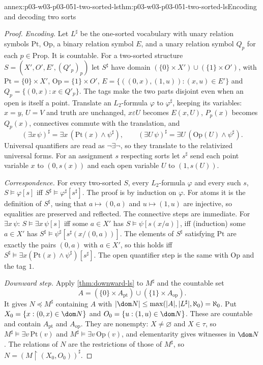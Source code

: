 \begin{annexitem}{annex:p03-w03-p03-051-two-sorted-ls}{thm:p03-w03-p03-051-two-sorted-ls}{Encoding and decoding two sorts}
\begin{proof}
\emph{Encoding.} Let \(L^\sharp\) be the one-sorted vocabulary with unary
relation symbols \(\mathrm{Pt}\), \(\mathrm{Op}\), a binary relation symbol
\(E\), and a unary relation symbol \(Q_p\) for each \(p\in\mathrm{Prop}\).
It is countable. For a two-sorted structure \(S=(X',O',E',(Q'_p)_p)\) let
\(S^\sharp\) have domain \((\{0\}\times X')\cup(\{1\}\times O')\), with
\(\mathrm{Pt}=\{0\}\times X'\), \(\mathrm{Op}=\{1\}\times O'\),
\(E=\{((0,x),(1,u)):(x,u)\in E'\}\) and
\(Q_p=\{(0,x):x\in Q'_p\}\). The tags make the two parts disjoint even when
an open is itself a point. Translate an \(L_2\)-formula \(\varphi\) to
\(\varphi^\sharp\), keeping its variables: \(x=y\), \(U=V\) and truth are
unchanged, \(x\varepsilon U\) becomes \(E(x,U)\), \(P_p(x)\) becomes
\(Q_p(x)\), connectives commute with the translation, and
\[
 (\exists x\,\psi)^\sharp=\exists x\,(\mathrm{Pt}(x)\land\psi^\sharp),\qquad
 (\exists U\,\psi)^\sharp=\exists U\,(\mathrm{Op}(U)\land\psi^\sharp).
\]
Universal quantifiers are read as \(\neg\exists\neg\), so they translate
to the relativized universal forms. For an assignment \(s\) respecting
sorts let \(s^\sharp\) send each point variable \(x\) to \((0,s(x))\) and
each open variable \(U\) to \((1,s(U))\).

\emph{Correspondence.} For every two-sorted \(S\), every \(L_2\)-formula
\(\varphi\) and every such \(s\),
\(S\models\varphi[s]\) iff \(S^\sharp\models\varphi^\sharp[s^\sharp]\).
The proof is by induction on \(\varphi\). For atoms it is the definition
of \(S^\sharp\), using that \(a\mapsto(0,a)\) and \(u\mapsto(1,u)\) are
injective, so equalities are preserved and reflected. The connective steps
are immediate. For \(\exists x\,\psi\): \(S\models\exists x\,\psi[s]\) iff
some \(a\in X'\) has \(S\models\psi[s(x/a)]\), iff (induction) some
\(a\in X'\) has \(S^\sharp\models\psi^\sharp[s^\sharp(x/(0,a))]\). The
elements of \(S^\sharp\) satisfying \(\mathrm{Pt}\) are exactly the pairs
\((0,a)\) with \(a\in X'\), so this holds iff
\(S^\sharp\models\exists x(\mathrm{Pt}(x)\land\psi^\sharp)[s^\sharp]\).
The open quantifier step is the same with \(\mathrm{Op}\) and the tag
\(1\).

\emph{Downward step.} Apply \cref{thm:downward-ls} to \(M^\sharp\) and
the countable set
\[
 A=(\{0\}\times A_{\mathrm{pt}})\cup(\{1\}\times A_{\mathrm{op}}).
\]
It gives \(N\preccurlyeq M^\sharp\) containing \(A\) with
\(\lvert\dom N\rvert\le\max(\lvert A\rvert,\lvert L^\sharp\rvert,\aleph_0)
=\aleph_0\). Put \(X_0=\{x:(0,x)\in\dom N\}\) and
\(O_0=\{u:(1,u)\in\dom N\}\). These are countable and contain
\(A_{\mathrm{pt}}\) and \(A_{\mathrm{op}}\). They are nonempty: \(X\ne
\varnothing\) and \(X\in\tau\), so \(M^\sharp\models\exists v\,\mathrm{Pt}(v)\)
and \(M^\sharp\models\exists v\,\mathrm{Op}(v)\), and elementarity gives
witnesses in \(\dom N\). The relations of \(N\) are the restrictions of
those of \(M^\sharp\), so \(N=(M\restriction(X_0,O_0))^\sharp\).


\end{proof}
\end{annexitem}
